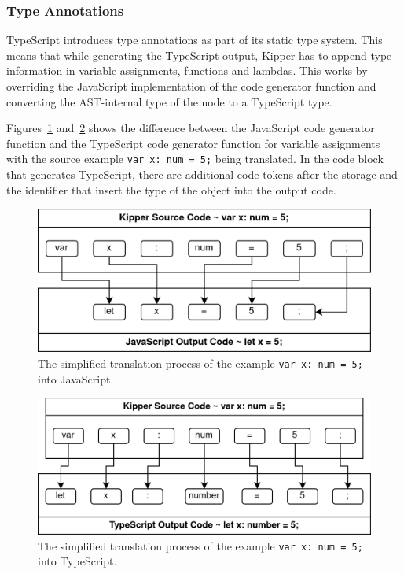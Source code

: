 \subsubsection{Type Annotations}

TypeScript introduces type annotations as part of its static type system. This means that while generating the TypeScript output, Kipper has to append type information in variable assignments, functions and lambdas. This works by overriding the JavaScript implementation of the code generator function and converting the AST-internal type of the node to a TypeScript type. 

Figures~\ref{fig:implementation:kipper-to-javascript-translation-example} and~\ref{fig:implementation:kipper-to-typescript-translation-example} shows the difference between the JavaScript code generator function and the TypeScript code generator function for variable assignments with the source example \lstinline|var x: num = 5;| being translated. In the code block that generates TypeScript, there are additional code tokens after the storage and the identifier that insert the type of the object into the output code.

\begin{figure}[h!]
	\centering
	\includegraphics[scale=1.1]{./pics/Kipper-to-JavaScript-Translation-Example}
	\caption{The simplified translation process of the example \lstinline|var x: num = 5;| into JavaScript.}
	\label{fig:implementation:kipper-to-javascript-translation-example}
\end{figure}

\begin{figure}[h!]
	\centering
	\includegraphics[scale=1.1]{./pics/Kipper-to-TypeScript-Translation-Example}
	\caption{The simplified translation process of the example \lstinline|var x: num = 5;| into TypeScript.}
	\label{fig:implementation:kipper-to-typescript-translation-example}
\end{figure}

